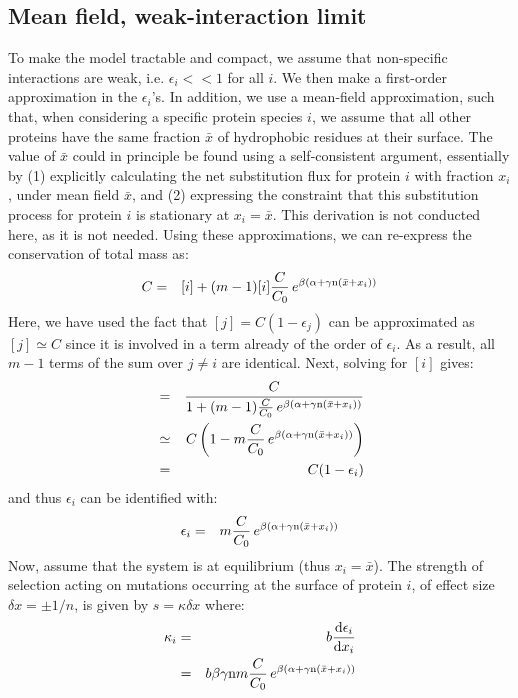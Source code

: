 \documentclass{article}
\begin{document}
\subsection{Mean field, weak-interaction limit}
To make the model tractable and compact, we assume that non-specific interactions are weak, i.e. $\epsilon_i << 1$ for all $i$. We then make a first-order approximation in the $\epsilon_i$'s. In addition, we use a mean-field approximation, such that, when considering a specific protein species $i$, we assume that all other proteins have the same fraction $\bar x$ of hydrophobic residues at their surface. The value of $\bar x$ could in principle be found using a self-consistent argument, essentially by (1) explicitly calculating the net substitution flux for protein $i$ with fraction $x_i$, under mean field $\bar x$, and (2) expressing the constraint that this substitution process for protein $i$ is stationary at $x_i = \bar x$. This derivation is not conducted here, as it is not needed.
Using these approximations, we can re-express the conservation of total mass as:
\begin{eqnarray}
C &=& [i] + (m-1) [i] \frac{C}{C_0} \, e^{\beta (\alpha + \gamma \text{n} (\bar x + x_i))}
\end{eqnarray}
Here, we have used the fact that $[j] = C(1 - \epsilon_j)$ can be approximated as $[j] \simeq C$ since it is involved in a term already of the order of $\epsilon_i$. As a result, all $m-1$ terms of the sum over $j\neq i$ are identical.
Next, solving for $[i]$ gives:
\begin{eqnarray}
[i] &=& \frac{C} {1 + (m-1) \frac{C}{C_0} \, e^{\beta (\alpha + \gamma \Nsite (\bar x + x_i))}}
\\ &\simeq& C \left( 1 - m \frac{C}{C_0} \, e^{\beta (\alpha + \gamma \Nsite (\bar x + x_i))} \right)
\\ &=&
C (1 - \epsilon_i)
\end{eqnarray}
and thus $\epsilon_i$ can be identified with:
\begin{eqnarray}
\epsilon_i  &=& m \frac{C}{C_0} \, e^{\beta (\alpha +\gamma \text{n} (\bar x + x_i))}
\end{eqnarray}
Now, assume that the system is at equilibrium (thus $x_i = \bar x$). The strength of selection acting on mutations occurring at the surface of protein $i$, of effect size $\delta x = \pm 1/n$, is given by $s = \kappa \delta x$ where:
\begin{eqnarray}
\kappa_i &=& b \frac{\mathrm{d}\epsilon_i} {\mathrm{d} x_i} 
\\ &=&
b \beta \gamma \text{n} m \frac{C}{C_0} \, e^{\beta (\alpha +\gamma \text{n} (\bar x + x_i))}
\end{eqnarray}
\end{document}
